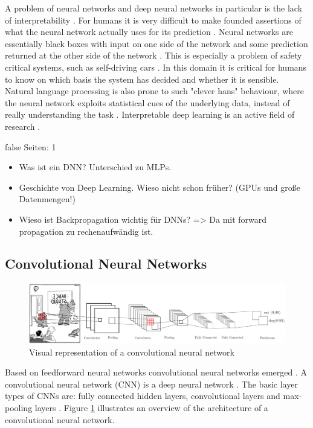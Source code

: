 \documentclass[draft,final,oneside]{vutinfth} %
\begin{document}
A problem of neural networks and deep neural networks in particular is the lack of interpretability \cite{interpretabledl}. For humans it is very difficult to make founded assertions of what the neural network actually uses for its prediction \cite{interpretabledl2}. Neural networks are essentially black boxes with input on one side of the network and some prediction returned at the other side of the network \cite{interpretabledl}. This is especially a problem of safety critical systems, such as self-driving cars \cite{selfdriving}. In this domain it is critical for humans to know on which basis the system has decided and whether it is sensible. Natural language processing is also prone to such "clever hans" behaviour, where the neural network exploits statistical cues of the underlying data, instead of really understanding the task \cite{cleverhans}. Interpretable deep learning is an active field of research \cite{interpretabledl}.

\if false
Seiten: 1
\begin{itemize}
\item Was ist ein DNN? Unterschied zu MLPs.
\item Geschichte von Deep Learning. Wieso nicht schon früher? (GPUs und große Datenmengen!)
\item Wieso ist Backpropagation wichtig für DNNs? => Da mit forward propagation zu rechenaufwändig ist.
\end{itemize}
\fi

\subsection{Convolutional Neural Networks} \label{mlcnn}

\begin{figure}[ht]
	\centering
  	\includegraphics[width=1.0\textwidth]{graphics/cnn.png}
	\caption{Visual representation of a convolutional neural network}
	\label{fig:cnn}
\end{figure}

Based on feedforward neural networks convolutional neural networks emerged \cite{bishop}. A convolutional neural network (CNN) is a deep neural network \cite{alexnet}. The basic layer types of CNNs are: fully connected hidden layers, convolutional layers and max-pooling layers \cite{Goodfellow-et-al-2016}. Figure \ref{fig:cnn} illustrates an overview of the architecture of a convolutional neural network.
\end{document}
